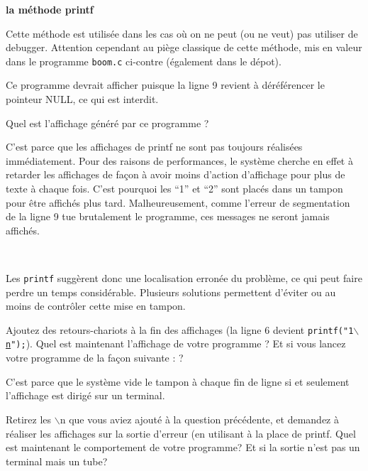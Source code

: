 \documentclass[10pt]{article}\usepackage[nu]{esial}
\begin{document}
\begin{Exercice}\textbf{la méthode printf}

  \noindent\begin{minipage}{.76\linewidth}
    Cette méthode est utilisée dans les cas où on ne peut (ou ne veut) pas
    utiliser de debugger. Attention cependant au piège classique de cette
    méthode, mis en valeur dans le programme \texttt{boom.c} ci-contre
    (également dans le dépot). 

    Ce programme devrait afficher 
    puisque la ligne 9 revient à déréférencer le pointeur NULL, ce qui est
    interdit.
    
    \Question Quel est l'affichage généré par ce programme ?

    C'est parce que les affichages de printf ne sont pas toujours réalisées
    immédiatement. Pour des raisons de performances, le système cherche en
    effet à retarder les affichages de façon à avoir moins d'action d'affichage
    pour plus de texte à chaque fois. C'est pourquoi les ``1'' et ``2'' sont
    placés dans un tampon pour être affichés plus tard. Malheureusement, comme
    l'erreur de segmentation de la ligne 9 tue brutalement le programme, ces
    messages ne seront jamais affichés.



  \end{minipage}~ \begin{minipage}{.23\linewidth}
  \end{minipage}

  \medskip
  Les \texttt{printf} suggèrent donc une localisation erronée du problème, ce
  qui peut faire perdre un temps considérable. Plusieurs solutions permettent
  d'éviter ou au moins de contrôler cette mise en tampon.

  \Question Ajoutez des retours-chariots à la fin des affichages (la ligne 6
  devient \texttt{printf("1\underline{$\backslash$n}");}). Quel est maintenant
  l'affichage de votre programme ? Et si vous lancez votre programme de la
  façon suivante :  ?

  C'est parce que le système vide le tampon à chaque fin de ligne si et
  seulement l'affichage est dirigé sur un terminal.

  \Question Retirez les $\backslash$n que vous aviez ajouté à la question
  précédente, et demandez à réaliser les affichages sur la sortie d'erreur (en
  utilisant  à la place de printf. Quel est
  maintenant le comportement de votre programme? Et si la sortie n'est pas un
  terminal mais un tube?


\end{Exercice}
\end{document}
